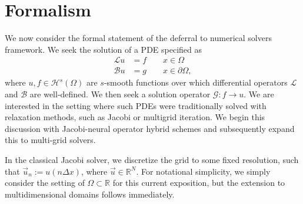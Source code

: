 \documentclass[12pt]{article}
\begin{document}
\newpage
\section{Formalism}
We now consider the formal statement of the deferral to numerical solvers framework. We seek the solution of a PDE specified as
\begin{align*}
    \mathcal{L} u  &= f \qquad x \in\Omega\\
    \mathcal{B} u  &= g \qquad x \in\partial\Omega,
\end{align*}
where $u,f\in\mathcal{H}^{s}(\Omega)$ are $s$-smooth functions over which differential operators $\mathcal{L}$ and $\mathcal{B}$ are well-defined. We then seek a solution operator $\mathcal{G} : f\to u$. We are interested in the setting where such PDEs were traditionally solved with relaxation methods, such as Jacobi or multigrid iteration. We begin this discussion with Jacobi-neural operator hybrid schemes and subsequently expand this to multi-grid solvers. 

In the classical Jacobi solver, we discretize the grid to some fixed resolution, such that $\vec{u}_{n} := u(n\Delta x)$, where $\vec{u}\in\mathbb{R}^{N}$. For notational simplicity, we simply consider the setting of $\Omega\subset\mathbb{R}$ for this current exposition, but the extension to multidimensional domains follows immediately. 
\end{document}
